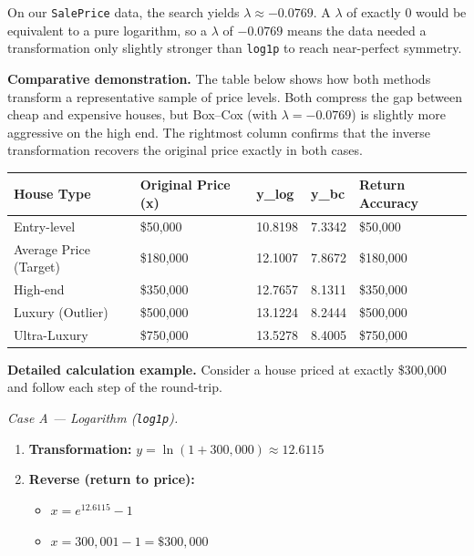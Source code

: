 On our \texttt{SalePrice} data, the search yields
\(\lambda \approx -0.0769\). A \(\lambda\) of exactly 0 would be
equivalent to a pure logarithm, so a \(\lambda\) of \(-0.0769\) means
the data needed a transformation only slightly stronger than
\texttt{log1p} to reach near-perfect symmetry.

\textbf{Comparative demonstration.} The table below shows how both
methods transform a representative sample of price levels. Both compress
the gap between cheap and expensive houses, but Box--Cox (with
\(\lambda = -0.0769\)) is slightly more aggressive on the high end. The
rightmost column confirms that the inverse transformation recovers the
original price exactly in both cases.

\begin{longtable}[]{@{}lllll@{}}
\toprule\noalign{}
House Type & Original Price (x) & y\_log & y\_bc & Return Accuracy \\
\midrule\noalign{}
\endhead
\bottomrule\noalign{}
\endlastfoot
Entry-level & \$50,000 & 10.8198 & 7.3342 & \$50,000 \\
Average Price (Target) & \$180,000 & 12.1007 & 7.8672 & \$180,000 \\
High-end & \$350,000 & 12.7657 & 8.1311 & \$350,000 \\
Luxury (Outlier) & \$500,000 & 13.1224 & 8.2444 & \$500,000 \\
Ultra-Luxury & \$750,000 & 13.5278 & 8.4005 & \$750,000 \\
\end{longtable}

\textbf{Detailed calculation example.} Consider a house priced at
exactly \$300,000 and follow each step of the round-trip.

\emph{Case A --- Logarithm (\texttt{log1p}).}

\begin{enumerate}
\def\labelenumi{\arabic{enumi}.}
\tightlist
\item
  \textbf{Transformation:} \(y = \ln(1 + 300{,}000) \approx 12.6115\)
\item
  \textbf{Reverse (return to price):}

  \begin{itemize}
  \tightlist
  \item
    \(x = e^{12.6115} - 1\)
  \item
    \(x = 300{,}001 - 1 = \$300{,}000\)
  \end{itemize}
\end{enumerate}

